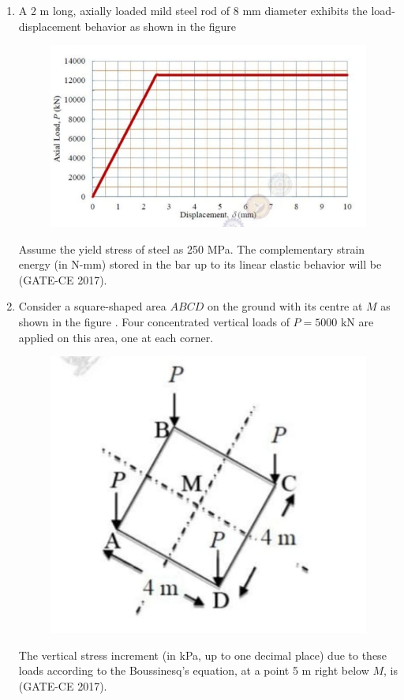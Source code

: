 \documentclass[journal,12pt,onecolumn]{article}
\theoremstyle{remark}
\begin{document}
\begin{enumerate}
    \item A 2 m long, axially loaded mild steel rod of 8 mm diameter exhibits the load-displacement  behavior as shown in the figure 
    \begin{figure}[H]
    \centering
    \includegraphics[width=0.7\columnwidth]{figs/q43.jpg}  
    \caption{}
    \label{fig:12}
    \end{figure}
    Assume the yield stress of steel as 250 MPa. The complementary strain energy (in N-mm) stored in the bar up to its linear elastic behavior will be \underline{\hspace{3cm}} \hfill (GATE-CE 2017).

    \item Consider a square-shaped area $ABCD$ on the ground with its centre at $M$ as shown in the figure  . Four concentrated vertical loads of $ P = 5000 $ kN are applied on this area, one at each corner.
    \begin{figure}[H]
    \centering
    \includegraphics[width=0.7\columnwidth]{figs/q44.jpg}  
    \caption{}
    \label{fig:13}
    \end{figure}
    The vertical stress increment (in kPa, up to one decimal place) due to these loads according to the Boussinesq's equation, at a point 5 m right below $M$, is \underline{\hspace{3cm}} \hfill (GATE-CE 2017).


\end{enumerate}
\end{document}
